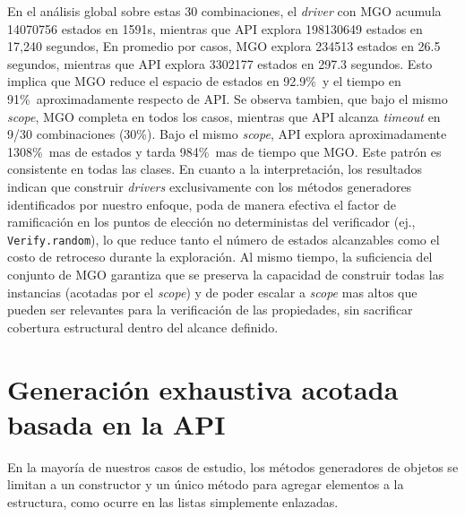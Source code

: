 En el análisis global sobre estas 30 combinaciones, el \emph{driver} con
\textsf{MGO} acumula 14070756 estados en 1591s, mientras que \textsf{API} explora 198130649 estados en 17,240 segundos,
En promedio por casos, \textsf{MGO} explora 234513 estados en 26.5 segundos, mientras que \textsf{API} 
explora 3302177 estados en 297.3 segundos. Esto implica que \textsf{MGO} reduce el espacio de estados en 
92.9\%\ y el tiempo en 91\%\ aproximadamente respecto de \textsf{API}. 
Se observa tambien, que bajo el mismo \emph{scope}, \textsf{MGO} completa en todos los casos, mientras que \textsf{API} alcanza \emph{timeout} en 9/30 combinaciones (30\%).
Bajo el mismo \emph{scope}, \textsf{API} explora aproximadamente 1308\%\ mas de estados y tarda 984\%\ mas de tiempo que \textsf{MGO}.
Este patrón es consistente en todas las clases.
En cuanto a la interpretación, los resultados indican que construir \emph{drivers}
exclusivamente con los métodos generadores identificados por nuestro enfoque,
poda de manera efectiva el factor de ramificación en los puntos de elección
no deterministas del verificador (ej., \texttt{Verify.random}), lo que reduce
tanto el número de estados alcanzables como el costo de retroceso durante la
exploración. Al mismo tiempo, la suficiencia del conjunto de \textsf{MGO}
garantiza que se preserva la capacidad de construir todas las instancias
(acotadas por el \emph{scope}) y de poder escalar a \emph{scope} mas altos que pueden ser 
relevantes para la verificación de las propiedades,
sin sacrificar cobertura estructural dentro del alcance definido.




\section{Generación exhaustiva acotada basada en la API}
\label{sec:experimentalBeapi}


En la mayoría de nuestros casos de estudio, los métodos generadores de objetos se limitan a un 
constructor y un único método para agregar elementos a la estructura, como ocurre en las listas 
simplemente enlazadas.  

